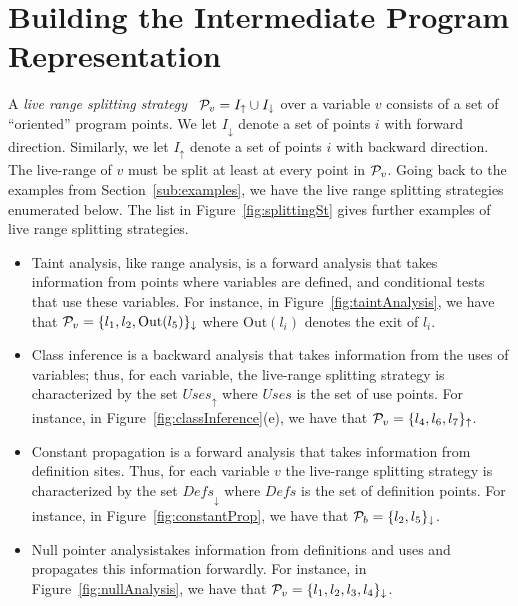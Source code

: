 \section{Building the Intermediate Program Representation}
\label{sec:building}
\def\Sdown{\downarrow}
\def\Sup{\uparrow}
\def\SS{{\cal P}}
\def\Out{\mathrm{Out}}
\def\In{\mathrm{In}}
\def\Defs{\mathrm{Defs}}
\def\Def{\mathrm{Def}}
\def\Uses{\mathrm{Uses}}

A {\em live range splitting strategy} \
$\SS_v = I_\uparrow \cup I_\downarrow$ over a variable $v$ consists of a set
of ``oriented'' program points.
We let $I_\downarrow$ denote a set of points $i$ with forward direction.
Similarly, we let $I_\uparrow$ denote a set of points $i$ with backward
direction.
The live-range of $v$ must be split at least at every point in $\SS_v$.
Going back to the examples from Section~\ref{sub:examples}, we have the live range splitting strategies enumerated below.
The list in Figure~\ref{fig:splittingSt} gives further examples of live range splitting strategies.

\begin{itemize}
\item Taint analysis, like range analysis, is a forward analysis that takes information from points where variables are defined, and conditional tests that use these variables.
For instance, in Figure~\ref{fig:taintAnalysis}, we have that $\SS_{v} = \{l_1, l_2, \Out(l_5)\}_\downarrow$ where $\Out(l_i)$ denotes the exit of $l_i$.

\item Class inference is a backward analysis that takes information from the uses of variables; thus, for each variable, the live-range splitting strategy is characterized by the set $\mathit{Uses}_\uparrow$ where $\mathit{Uses}$ is the set of use points.
For instance, in Figure~\ref{fig:classInference}(e), we have that
$\SS_{v} = \{l_4, l_6,l_7\}_\uparrow$.

\item Constant propagation is a forward analysis that takes information from definition sites.
Thus, for each variable $v$ the live-range splitting strategy is characterized by the set $\mathit{Defs}_\downarrow$ where $\mathit{Defs}$ is the set of
definition points.
For instance, in Figure~\ref{fig:constantProp}, we have that
$\SS_{b} = \{l_2, l_5\}_\downarrow$.

\item Null pointer analysistakes information from definitions and uses and propagates this information forwardly.
For instance, in Figure~\ref{fig:nullAnalysis}, we have that
$\SS_{v} = \{l_1, l_2, l_3, l_4\}_\downarrow$.
\end{itemize}


